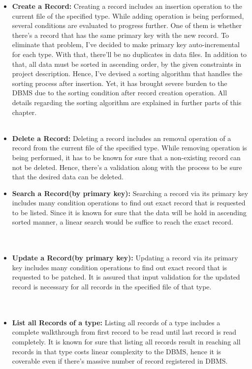 \documentclass[12pt]{report}
\begin{document}
\begin{itemize}
\vspace{1cm}
\item \textbf{Create a Record:} Creating a record includes an insertion operation to the current file of the specified type. While adding operation is being performed, several conditions are evaluated to progress further. One of them is whether there's a record that has the same primary key with the new record. To eliminate that problem, I've decided to make primary key auto-incremental for each type. With that, there'll be no duplicates in data files. In addition to that, all data must be sorted in ascending order, by the given constraints in project description. Hence, I've devised a sorting algorithm that handles the sorting process after insertion. Yet, it has brought severe burden to the DBMS due to the sorting condition after record creation operation. All details regarding the sorting algorithm are explained in further parts of this chapter. \\\\
\item \textbf{Delete a Record:} Deleting a record includes an removal operation of a record from the current file of the specified type. While removing operation is being performed, it has to be known for sure that a non-existing record can not be deleted. Hence, there's a validation along with the process to be sure that the desired data can be deleted.

\newpage

\vspace{3cm}
\item \textbf{Search a Record(by primary key):} Searching a record via its primary key includes many condition operations to find out exact record that is requested to be listed. Since it is known for sure that the data will be hold in ascending sorted manner, a linear search would be suffice to reach the exact record.  \\\\\\
\item \textbf{Update a Record(by primary key):} Updating a record via its primary key includes many condition operations to find out exact record that is requested to be patched. It is assured that input validation for the updated record is necessary for all records in the specified file of that type. \\\\\\
\item \textbf{List all Records of a type:} Listing all records of a type includes a complete walkthrough from first record to be read until last record is read completely. It is known for sure that listing all records result in reaching all records in that type costs linear complexity to the DBMS, hence it is coverable even if there's massive number of record registered in DBMS.
\end{itemize}
\end{document}
